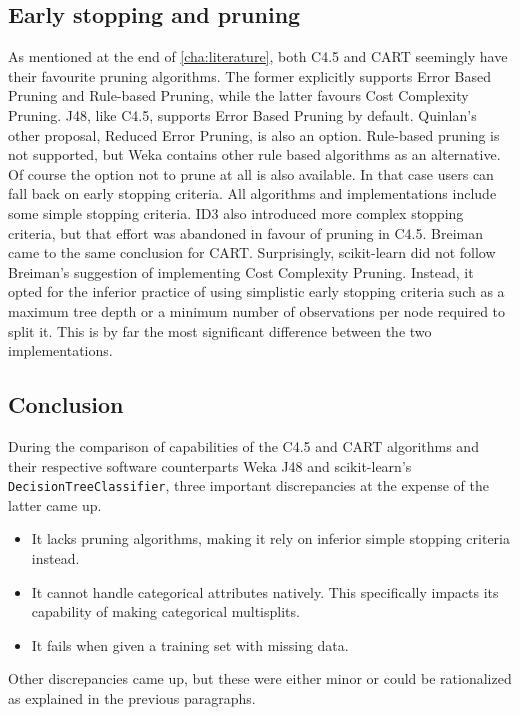 \subsection{Early stopping and pruning}
As mentioned at the end of \autoref{cha:literature}, both C4.5 and CART seemingly have their favourite pruning algorithms. The former explicitly supports Error Based Pruning and Rule-based Pruning, while the latter favours Cost Complexity Pruning. J48, like C4.5, supports Error Based Pruning by default. Quinlan's other proposal, Reduced Error Pruning, is also an option. Rule-based pruning is not supported, but Weka contains other rule based algorithms as an alternative. Of course the option not to prune at all is also available. In that case users can fall back on early stopping criteria. All algorithms and implementations include some simple stopping criteria. ID3 also introduced more complex stopping criteria, but that effort was abandoned in favour of pruning in C4.5. Breiman came to the same conclusion for CART. Surprisingly, scikit-learn did not follow Breiman's suggestion of implementing Cost Complexity Pruning. Instead, it opted for the inferior practice of using simplistic early stopping criteria such as a maximum tree depth or a minimum number of observations per node required to split it. This is by far the most significant difference between the two implementations.

\subsection{Conclusion}
During the comparison of capabilities of the C4.5 and CART algorithms and their respective software counterparts Weka J48 and scikit-learn's \texttt{DecisionTreeClassifier}, three important discrepancies at the expense of the latter came up. 
\begin{itemize}
    \item It lacks pruning algorithms, making it rely on inferior simple stopping criteria instead.
    \item It cannot handle categorical attributes natively. This specifically impacts its capability of making categorical multisplits.
    \item It fails when given a training set with missing data.
\end{itemize}

Other discrepancies came up, but these were either minor or could be rationalized as explained in the previous paragraphs.


